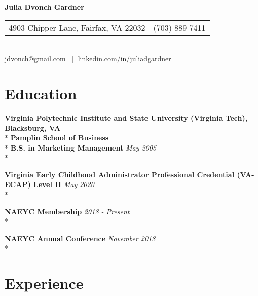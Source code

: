 \documentclass{article}
\begin{document}
\begin{center} 
\textbf{\LARGE Julia Dvonch Gardner} \\
\begin{tabular}{@{} l l}
	4903 Chipper Lane, Fairfax, VA 22032 		& (703) 889-7411 \\

\end{tabular} \\
\href{mailto:jdvonch@gmail.com}{jdvonch@gmail.com} $\parallel$ \href{https://www.linkedin.com/in/juliadgardner}{linkedin.com/in/juliadgardner}  \\
\end{center}


\section{Education} 

\noindent \textbf{Virginia Polytechnic Institute and State University (Virginia Tech),  \hfill Blacksburg, VA} \\*
\textbf{Pamplin School of Business} \\*
\textbf{B.S. in Marketing Management} \hfill \textit{May 2005} \\*

\noindent \textbf{Virginia Early Childhood Administrator Professional Credential (VA-ECAP) Level II} \hfill \textit{May 2020} \\*

\noindent \textbf{NAEYC Membership} \hfill \textit{2018 - Present} \\*

\noindent \textbf{NAEYC Annual Conference} \hfill \textit{November 2018} \\*


\section{Experience}
\end{document}
